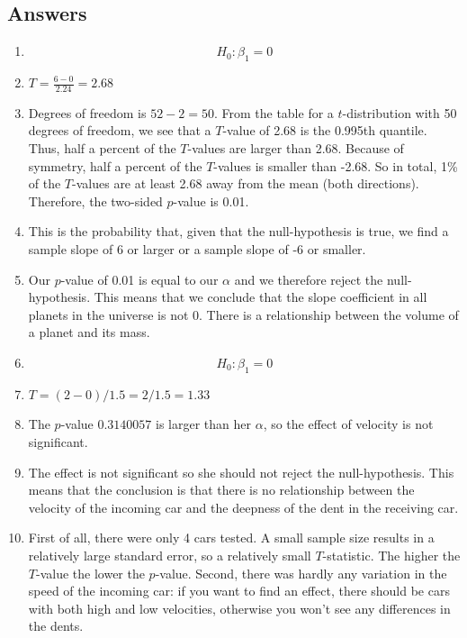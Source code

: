 \documentclass[]{report}\usepackage[]{graphicx}\usepackage[]{color}
\begin{document}
\subsection{Answers}

\begin{enumerate}

\item

\begin{equation}
H_0: \beta_1 = 0
\end{equation}



\item $T= \frac{6 - 0}{2.24}= 2.68 $

\item

Degrees of freedom is $52-2=50$. From the table for a $t$-distribution with 50 degrees of freedom, we see that a $T$-value of 2.68 is the 0.995th quantile. Thus, half a percent of the $T$-values are larger than 2.68. Because of symmetry, half a percent of the $T$-values is smaller than -2.68. So in total, 1\% of the $T$-values are at least 2.68 away from the mean (both directions). Therefore, the two-sided $p$-value is 0.01.

\item This is the probability that, given that the null-hypothesis is true, we find a sample slope of 6 or larger or a sample slope of -6 or smaller.

\item Our $p$-value of 0.01 is equal to our $\alpha$ and we therefore reject the null-hypothesis. This means that we conclude that the slope coefficient in all planets in the universe is not 0. There is a relationship between the volume of a planet and its mass.

\item

\begin{equation}
H_0: \beta_1= 0
\end{equation}

\item
$T= (2-0)/1.5=2/1.5=1.33$

\item
The $p$-value $0.3140057$ is larger than her $\alpha$, so the effect of velocity is not significant.

\item
 The effect is not significant so she should not reject the null-hypothesis. This means that the conclusion is that there is no relationship between the velocity of the incoming car and the deepness of the dent in the receiving car.

\item First of all, there were only 4 cars tested. A small sample size results in a relatively large standard error, so a relatively small $T$-statistic. The higher the $T$-value the lower the $p$-value. Second, there was hardly any variation in the speed of the incoming car: if you want to find an effect, there should be cars with both high and low velocities, otherwise you won't see any differences in the dents.

\end{enumerate}
\end{document}
